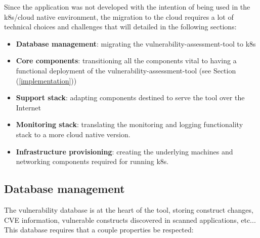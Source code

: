 \documentclass[11pt]{article}
\begin{document}
\hspace{5mm} Since the application was not developed with the intention of being used in the k8s/cloud native environment, the migration to the cloud requires a lot of technical choices and challenges that will detailed in the following sections:
\begin{itemize}
    \item \textbf{Database management}: migrating the vulnerability-assessment-tool to k8s
    \item \textbf{Core components}: transitioning all the components vital to having a functional deployment of the vulnerability-assessment-tool (see Section (\ref{implementation}))
    \item \textbf{Support stack}: adapting components destined to serve the tool over the Internet
    \item \textbf{Monitoring stack}: translating the monitoring and logging functionality stack to a more cloud native version. 
    \item \textbf{Infrastructure provisioning}: creating the underlying machines and networking components required for running k8s.
\end{itemize}

\subsection{Database management}

\hspace{5mm} The vulnerability database is at the heart of the tool, storing construct changes, CVE information, vulnerable constructs discovered in scanned applications, etc... This database requires that a couple properties be respected:
\end{document}
